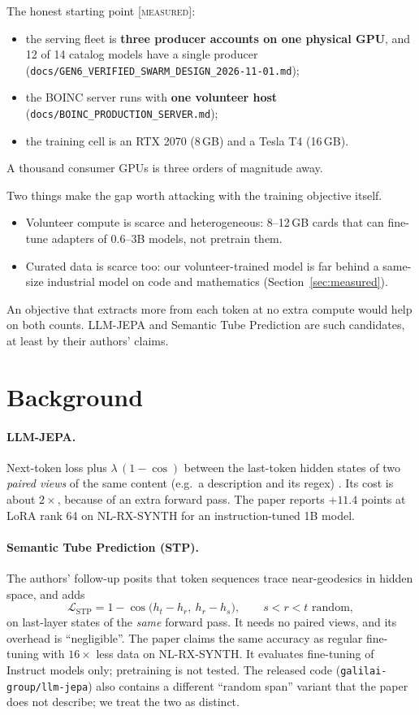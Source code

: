 \documentclass[11pt]{article}
\newcommand{\measured}{\textnormal{\textsc{[measured]}}}
\begin{document}
The honest starting point \measured:
\begin{itemize}
\item the serving fleet is \textbf{three producer accounts on one physical GPU}, and 12 of 14 catalog models have a
single producer (\texttt{docs/GEN6\_VERIFIED\_SWARM\_DESIGN\_2026-11-01.md});
\item the BOINC server runs with \textbf{one volunteer host} (\texttt{docs/BOINC\_PRODUCTION\_SERVER.md});
\item the training cell is an RTX 2070 (8\,GB) and a Tesla T4 (16\,GB).
\end{itemize}
A thousand consumer GPUs is three orders of magnitude away.

Two things make the gap worth attacking with the training objective itself.
\begin{itemize}
\item Volunteer compute is scarce and heterogeneous: 8--12\,GB cards that can fine-tune adapters of 0.6--3B models, not
pretrain them.
\item Curated data is scarce too: our volunteer-trained model is far behind a same-size industrial model on code and
mathematics (Section~\ref{sec:measured}).
\end{itemize}
An objective that extracts more from each token at no extra compute would help on both counts. LLM-JEPA
\cite{huang2025llmjepa} and Semantic Tube Prediction \cite{huang2026stp} are such candidates, at least by their
authors' claims.

\section{Background}
\paragraph{LLM-JEPA.} Next-token loss plus $\lambda\,(1-\cos)$ between the last-token hidden states of two \emph{paired
views} of the same content (e.g.\ a description and its regex) \cite{huang2025llmjepa}. Its cost is about $2\times$,
because of an extra forward pass. The paper reports $+11.4$ points at LoRA rank 64 on NL-RX-SYNTH for an
instruction-tuned 1B model.

\paragraph{Semantic Tube Prediction (STP).} The authors' follow-up \cite{huang2026stp} posits that token sequences trace
near-geodesics in hidden space, and adds
\begin{equation}
\mathcal{L}_{\text{STP}} = 1-\cos\big(h_t-h_r,\ h_r-h_s\big),\qquad s<r<t \text{ random},
\end{equation}
on last-layer states of the \emph{same} forward pass. It needs no paired views, and its overhead is ``negligible''. The
paper claims the same accuracy as regular fine-tuning with $16\times$ less data on NL-RX-SYNTH. It evaluates
fine-tuning of Instruct models only; pretraining is not tested. The released code
(\texttt{galilai-group/llm-jepa}) also contains a different ``random span'' variant that the paper does not describe;
we treat the two as distinct.
\end{document}
